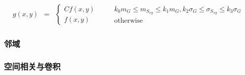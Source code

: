 \documentclass{beamer}
\newcommand{\nospace}{}
\begin{document}
{{\begin{frame}
  
  \begin{eqnarray*}
    g (x, y) & = & \left\{\begin{array}{l}
      C \nospace f (x, y)\\
      f (x, y)
    \end{array}\right. \qquad \begin{array}{l}
      k_0 m_G \leqslant m_{S_{x \nospace y}} \leqslant k_1 m_G, k_2 \sigma_G
      \leqslant \sigma_{S_{x \nospace y}} \leqslant k_3 \sigma_G\\
      \text{otherwise}
    \end{array}
  \end{eqnarray*}
\end{frame}}{\begin{frame}
  \frametitle{邻域}
  
\end{frame}}{\begin{frame}
  \frametitle{空间相关与卷积}
  

\end{frame}}}
\end{document}
